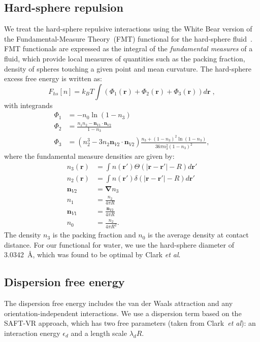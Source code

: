 \documentclass[twocolumn,amsmath,amssymb,prl]{revtex4-1}
\newcommand{\xx}{\textbf{r}}
\newcommand\epsilondisp{\ensuremath{\epsilon_\textit{d}}}
\newcommand\lambdadisp{\ensuremath{\lambda_\textit{d}}}
\begin{document}
\subsection{Hard-sphere repulsion}

We treat the hard-sphere repulsive interactions using the White Bear version of
the Fundamental-Measure Theory~(FMT) functional for the hard-sphere
fluid~\cite{roth2002whitebear, yu2002structures}.  FMT functionals are expressed as the integral of
the \emph{fundamental measures} of a fluid, which provide local
measures of quantities such as the packing fraction, density of
spheres touching a given point and mean curvature.  The hard-sphere
excess free energy is written as:
\begin{equation}
F_{hs}[n] = k_B T \int (\Phi_1(\xx) + \Phi_2(\xx) + \Phi_3(\xx)) d\xx \; ,
\end{equation}
with integrands
\begin{align}
\Phi_1 &= -n_0 \ln\left( 1 - n_3\right)\\
\Phi_2 &= \frac{n_1 n_2 - \mathbf{n}_{V1} \cdot\mathbf{n}_{V2}}{1-n_3} \\
\Phi_3 &= (n_2^3 - 3n_2 \mathbf{n}_{V2} \cdot \mathbf{n}_{V2})
  \frac{
    n_3 + (1-n_3)^2\ln(1-n_3)
  }{
    36\pi n_3^2\left( 1 - n_3 \right)^2
  } ,
\end{align}
where the fundamental measure densities are given by:
\begin{align}
  n_3(\xx) &= \int n(\xx') \Theta(\left|\xx - \xx'\right| - R) d\xx' \\
  n_2(\xx) &= \int n(\xx') \delta(\left|\xx - \xx'\right| - R) d\xx'
  \\
  \mathbf{n}_{V2} &= \mathbf{\nabla} n_3 \\
  n_1 &= \frac{n_2}{4\pi R}\\
  \mathbf{n}_{V1} &= \frac{\mathbf{n}_{V2}}{4\pi R}\\
  n_0 &= \frac{n_2}{4\pi R^2}.
\end{align}
The density $n_3$ is the packing fraction and $n_0$ is the
average density at contact distance. For our functional for water, we
use the hard-sphere diameter of 3.0342~\AA, which was found to be
optimal by Clark \emph{et al}.\cite{clark2006developing}

\subsection{Dispersion free energy}
The dispersion free energy includes the van der Waals attraction and
any orientation-independent interactions. We use a dispersion term
based on the SAFT-VR approach\cite{gil-villegas-1997-SAFT-VR}, which
has two free parameters (taken from Clark~\emph{et
  al}\cite{clark2006developing}): an interaction energy $\epsilondisp$
and a length scale $\lambdadisp R$.
\end{document}
